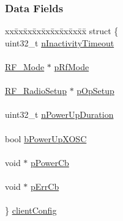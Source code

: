 \subsubsection*{Data Fields}
\begin{DoxyCompactItemize}
\item 
\begin{tabbing}
xx\=xx\=xx\=xx\=xx\=xx\=xx\=xx\=xx\=\kill
struct \{\\
\>uint32\_t \hyperlink{struct_r_f___object_acab4c0d923181e985a2867b51f74edcc}{nInactivityTimeout}\\
\>\\
\>\hyperlink{struct_r_f___mode}{RF\_Mode} $\ast$ \hyperlink{struct_r_f___object_a54a6ee0cde609ca67902a16f9279ca42}{pRfMode}\\
\>\\
\>\hyperlink{union_r_f___radio_setup}{RF\_RadioSetup} $\ast$ \hyperlink{struct_r_f___object_a1a082f0e3e4d1cc3d42438e9c008731a}{pOpSetup}\\
\>\\
\>uint32\_t \hyperlink{struct_r_f___object_a1c977babafc1c400ee7065d588400d62}{nPowerUpDuration}\\
\>\\
\>bool \hyperlink{struct_r_f___object_a2639ebccaae9e421775673e83d477d93}{bPowerUpXOSC}\\
\>\\
\>void $\ast$ \hyperlink{struct_r_f___object_ab93839cd7dc102b3eb1c79a3dceb194d}{pPowerCb}\\
\>\\
\>void $\ast$ \hyperlink{struct_r_f___object_adf7c2500d579f201e49a6c87e447991b}{pErrCb}\\
\>\\
\} \hyperlink{struct_r_f___object_aa469075966fd8d652e93528c33a02578}{clientConfig}\\


\end{tabbing}
\end{DoxyCompactItemize}
